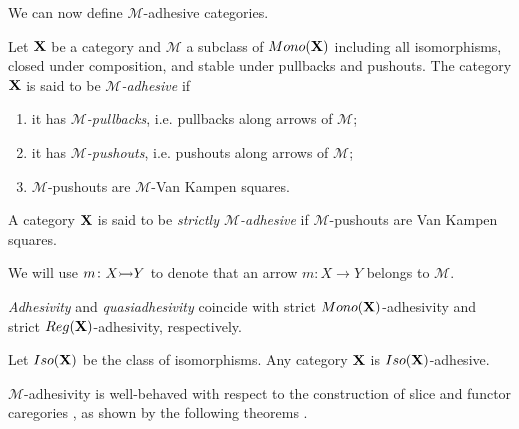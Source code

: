 \documentclass[a4paper,UKenglish,cleveref,pdftex,thm-restate,numberwithinsect,anonymous]{lipics}
\newcommand{\mon}{\mathsf{Mono}}
\newcommand{\reg}{\mathsf{Reg}}
\def\A{\textbf {\textup{A}}}
\newcommand{\mto}[0]{\scalebox{1}{$\rightarrowtail$}}
\def\B{\textbf {\textup{B}}}
\def\C{\textbf {\textup{C}}}
\def\X{\textbf {\textup{X}}}
\newcommand{\comma}[2]{#1\hspace{1pt} {\downarrow}\hspace{1pt} #2}
\newcommand{\cma}[2]{\mathcal{#1}\hspace{1pt} {\downarrow}\hspace{1pt} \mathcal{#2}}
\begin{document}
We can now define $\mathcal{M}$-adhesive categories.

\begin{definition}
  Let $\X$ be a category and $\mathcal{M}$ a subclass of
  $\mon(\X)$
  including  all isomorphisms, closed under composition,
  and stable under pullbacks and pushouts.
  The category
  $\X$ is said to be \emph{$\mathcal{M}$-adhesive} if
  \begin{enumerate}
  \item it has \emph{$\mathcal{M}$-pullbacks}, i.e. pullbacks along arrows of $\mathcal{M}$;
  \item it has \emph{$\mathcal{M}$-pushouts}, i.e. pushouts along arrows of $\mathcal{M}$;
  \item  $\mathcal{M}$-pushouts are $\mathcal{M}$-Van Kampen squares.
  \end{enumerate}
  
  A category $\X$ is said to be \emph{strictly $\mathcal{M}$-adhesive}
  if $\mathcal{M}$-pushouts are Van Kampen squares.
\end{definition}

We will use $m\colon X\mto Y$ to denote that an arrow $m\colon X\to Y$ belongs to $\mathcal{M}$.

\begin{remark}
  \label{rem:salva}
  \emph{Adhesivity} and \emph{quasiadhesivity} 
  \cite{lack2005adhesive,garner2012axioms} coincide with strict
  $\mon(\X) $-adhesivity and strict $\reg(\X)$-adhesivity,
  respectively.
\end{remark}

\begin{example}
  \label{rem:iso}
  Let $\mathsf{Iso(\X)}$ be the class of 
  isomorphisms. Any category $\X$ is $\mathsf{Iso(\X)}$-adhesive.
\end{example}

$\mathcal{M}$-adhesivity is well-behaved with respect to  the construction of slice and functor caregories \cite{mac2013categories}, as shown by the following theorems \cite{ehrig2006fundamentals,lack2005adhesive}.
\end{document}
